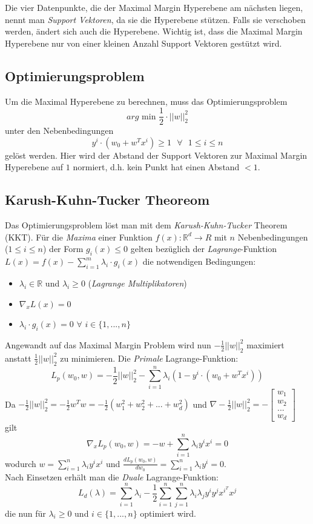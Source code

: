 \documentclass{report}
\begin{document}
  Die vier Datenpunkte, die der Maximal Margin Hyperebene am nächsten liegen, nennt man \textit{Support Vektoren},	
  da sie die Hyperebene stützen. Falls sie verschoben werden, ändert sich auch die Hyperebene. Wichtig ist, dass die	
  Maximal Margin Hyperebene nur von einer kleinen Anzahl Support Vektoren gestützt wird.	
  
  \subsection{Optimierungsproblem}	
  Um die Maximal Hyperebene zu berechnen, muss das Optimierungsproblem	
  $$arg\text{ min }\frac{1}{2}\cdot ||w||_2^2$$	
  unter den Nebenbedingungen	
  $$y^i\cdot(w_0 + w^Tx^i) \geq 1\text{ }\forall\text{ }1\leq i \leq n$$	
  gelöst werden. Hier wird der Abstand der Support Vektoren zur Maximal Margin Hyperebene auf $1$ normiert,	
  d.h. kein Punkt hat einen Abstand $< 1$.\par	
  
  \subsection{Karush-Kuhn-Tucker Theoreom}	
  
  Das Optimierungsproblem löst man mit dem \textit{Karush-Kuhn-Tucker} Theorem (KKT). Für die \textit{Maxima}	
  einer Funktion $f(x): \mathbb{R}^d \rightarrow R$ mit $n$ Nebenbedingungen ($1\leq i \leq n$) der Form $g_i(x)\leq 0$ gelten	
  bezüglich der \textit{Lagrange}-Funktion $L(x) = f(x) - \sum_{i=1}^m\lambda_i\cdot g_i(x)$ die notwendigen Bedingungen:\\	
  \vspace*{-1.5em}	
  \begin{itemize}	
    \item $\lambda_i\in \mathbb{R}$ und $\lambda_i \geq 0$ (\textit{Lagrange Multiplikatoren})	
    \item $\nabla_xL(x) = 0$	
    \item $\lambda_i\cdot g_i(x) = 0$ $\forall$ $i\in \{1, ..., n\}$	
  \end{itemize}	
  
  Angewandt auf das Maximal Margin Problem wird nun $-\frac{1}{2}||w||_2^2$ maximiert anstatt $\frac{1}{2}||w||_2^2$ zu minimieren.	
  Die \textit{Primale} Lagrange-Funktion:	
  $$L_p(w_0, w) = -\frac{1}{2}||w||_2^2 - \sum_{i=1}^n\lambda_i(1 - y^i\cdot(w_0 + w^Tx^i))$$	
  Da $-\frac{1}{2}||w||_2^2 = -\frac{1}{2}w^Tw = -\frac{1}{2}(w_1^2 + w_2^2 + ... + w_d^2)$	
  und $\nabla -\frac{1}{2}||w||_2^2 = -\begin{bmatrix}w_1\\w_2\\...\\w_d\end{bmatrix}$ gilt	
  $$\nabla_xL_p(w_0, w) = -w + \sum_{i=1}^n\lambda_iy^ix^i = 0$$	
  wodurch $w = \sum_{i=1}^n\lambda_iy^ix^i$ und $\frac{dL_p(w_0, w)}{dw_0} = \sum_{i=1}^n\lambda_iy^i = 0$.\\	
  Nach Einsetzen erhält man die \textit{Duale} Lagrange-Funktion:	
  $$L_d(\lambda) = \sum_{i=1}^n\lambda_i - \frac{1}{2}\sum_{i=1}^n\sum_{j=1}^n\lambda_i\lambda_jy^iy^jx^{i^T}x^j$$	
  die nun für $\lambda_i \geq 0$ und $i\in \{1,..., n\}$ optimiert wird.	
  
\end{document}
